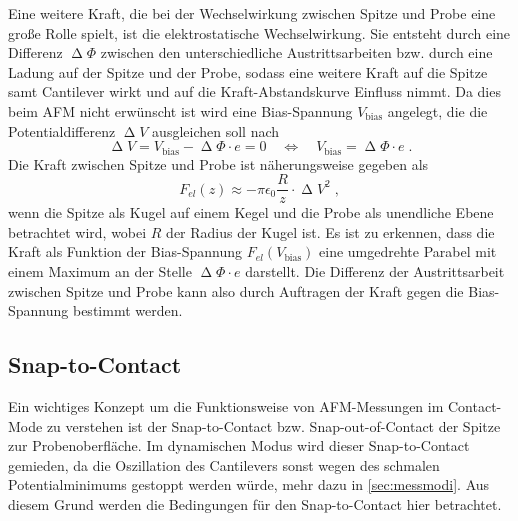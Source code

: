     Eine weitere Kraft, die bei der Wechselwirkung zwischen Spitze und Probe eine große Rolle spielt, ist die elektrostatische Wechselwirkung.
    Sie entsteht durch eine Differenz $\upDelta \Phi$ zwischen den unterschiedliche Austrittsarbeiten bzw. durch eine Ladung auf der Spitze und der Probe, sodass eine weitere Kraft auf die Spitze samt Cantilever wirkt und auf die Kraft-Abstandskurve Einfluss nimmt.
    Da dies beim AFM nicht erwünscht ist wird eine Bias-Spannung $V_{\mathrm{bias}}$ angelegt, die die Potentialdifferenz $\upDelta V$ ausgleichen soll nach 
    \begin{equation}
        \upDelta V = V_{\mathrm{bias}} - \upDelta \Phi \cdot e = 0 \quad \Leftrightarrow \quad V_{\mathrm{bias}} = \upDelta \Phi \cdot e \;.
    \end{equation}
    Die Kraft zwischen Spitze und Probe ist näherungsweise gegeben als
    \begin{equation}
        F_{el}(z) \approx -\pi \epsilon_0 \frac{R}{z} \cdot \upDelta V^2 \;,
    \end{equation}
    wenn die Spitze als Kugel auf einem Kegel und die Probe als unendliche Ebene betrachtet wird, wobei $R$ der Radius der Kugel ist.
    Es ist zu erkennen, dass die Kraft als Funktion der Bias-Spannung $F_{el}(V_{\mathrm{bias}})$ eine umgedrehte Parabel mit einem Maximum an der Stelle $\upDelta \Phi \cdot e$ darstellt.
    Die Differenz der Austrittsarbeit zwischen Spitze und Probe kann also durch Auftragen der Kraft gegen die Bias-Spannung bestimmt werden.

\subsection{Snap-to-Contact}
\label{sec:Snap}
    Ein wichtiges Konzept um die Funktionsweise von AFM-Messungen im Contact-Mode zu verstehen ist der Snap-to-Contact bzw. Snap-out-of-Contact der Spitze zur Probenoberfläche.
    Im dynamischen Modus wird dieser Snap-to-Contact gemieden, da die Oszillation des Cantilevers sonst wegen des schmalen Potentialminimums gestoppt werden würde, mehr dazu in \autoref{sec:messmodi}.
    Aus diesem Grund werden die Bedingungen für den Snap-to-Contact hier betrachtet.

